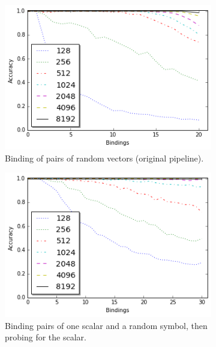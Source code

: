 \documentclass[conference]{IEEEtran}
\begin{document}
		\begin{figure}[th!]
			\begin{subfigure}{0.45\columnwidth}
				\center
				\includegraphics[width=1\columnwidth]{img/capacity.png}
				\caption{Binding of pairs of random vectors (original pipeline).}
				\label{fig:capacity}
			\end{subfigure}
			\begin{subfigure}{0.45\columnwidth}
				\center
				\includegraphics[width=1\columnwidth]{img/capacity_scalar_30.png}
				\caption{Binding pairs of one scalar and a random symbol, then probing for the scalar.}
				\label{fig:capacity_scalar}
			\end{subfigure}	
			\center
			\begin{subfigure}{0.45\columnwidth}
				\center

\end{subfigure}
\end{figure}
\end{document}
